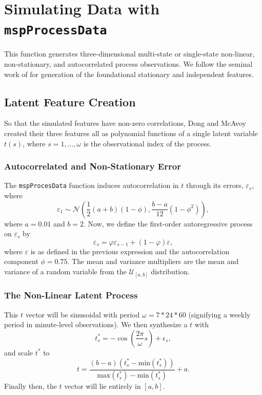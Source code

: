 \documentclass{report}\usepackage[]{graphicx}\usepackage[]{color}
\begin{document}

\section{Simulating Data with \texttt{mspProcessData}} \label{sec:D_DataGen}
This function generates three-dimensional multi-state or single-state non-linear, non-stationary, and autocorrelated process observations. We follow the seminal work of \cite{dong_batch_1996} for generation of the foundational stationary and independent features.


\subsection{Latent Feature Creation}
So that the simulated features have non-zero correlations, Dong and McAvoy created their three features all as polynomial functions of a single latent variable $t(s)$, where $s = 1, \ldots, \omega$ is the observational index of the process.

\subsubsection{Autocorrelated and Non-Stationary Error}
The \texttt{mspProcesData} function induces autocorrelation in $t$ through its errors, $\varepsilon_s$, where
\[
  \varepsilon_1 \sim \mathcal{N}\left(\frac{1}{2}(a + b)(1 - \phi), \frac{b - a}{12} (1 - \phi ^ 2)\right),
\]
where $a = 0.01$ and $b = 2$. Now, we define the first-order autoregressive process on $\varepsilon_s$ by
\[
  \varepsilon_s = \varphi\varepsilon_{s - 1} + (1 - \varphi)\varepsilon,
\]
where $\varepsilon$ is as defined in the previous expression and the autocorrelation component $\phi = 0.75$. The mean and variance multipliers are the mean and variance of a random variable from the $\mathcal{U}_{[a,b]}$ distribution.

\subsubsection{The Non-Linear Latent Process}
This $t$ vector will be sinusoidal with period $\omega = 7 * 24 * 60$ (signifying a weekly period in  minute-level observations). We then synthesize a $t$ with
\[
  t^*_s = -\cos\left( \frac{2\pi}{\omega} s \right) + \epsilon_s,
\]
and scale $t^*$ to
\[
  t = \frac{(b - a)(t^*_s - \text{min}(t^*_s))}{\text{max}(t^*_s) - \text{min}(t^*_s)} + a.
\]
Finally then, the $t$ vector will lie entirely in $[a,b]$.
\end{document}
